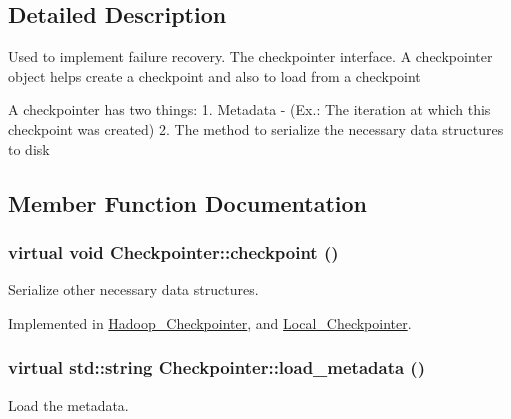 \subsection{Detailed Description}
Used to implement failure recovery. The checkpointer interface. A checkpointer object helps create a checkpoint and also to load from a checkpoint

A checkpointer has two things: 1. Metadata -\/ (Ex.: The iteration at which this checkpoint was created) 2. The method to serialize the necessary data structures to disk 

\subsection{Member Function Documentation}
\hypertarget{class_checkpointer_a7a0f2b3220292d7a3be972776ea8f2d3}{
\subsubsection[{checkpoint}]{\setlength{\rightskip}{0pt plus 5cm}virtual void Checkpointer::checkpoint ()}}
\label{class_checkpointer_a7a0f2b3220292d7a3be972776ea8f2d3}


Serialize other necessary data structures. 



Implemented in \hyperlink{class_hadoop___checkpointer_acf19b7cb85d84a51584bd06de37e8fee}{Hadoop\_\-Checkpointer}, and \hyperlink{class_local___checkpointer_aa271d3a80545d6a962c959c82fa7b7c7}{Local\_\-Checkpointer}.

\hypertarget{class_checkpointer_ab3823bbe8bab653084697af29296323d}{
\subsubsection[{load\_\-metadata}]{\setlength{\rightskip}{0pt plus 5cm}virtual std::string Checkpointer::load\_\-metadata ()}}
\label{class_checkpointer_ab3823bbe8bab653084697af29296323d}


Load the metadata. 



